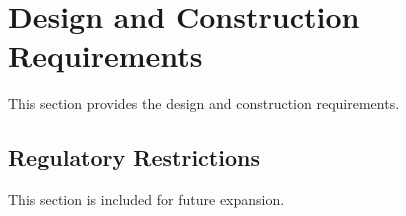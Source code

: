 \KNEADSECTIONNEWPAGE
\section{Design and Construction Requirements}
\label{lab:sec_DesignConstructionRequirements}
% 

This section provides the \ThisSys design and construction requirements.

\KNEADSUBSECTIONNEWPAGE
\subsection{Regulatory Restrictions}
\label{lab:ssec_RegulatoryRestrictions}

This section is included for future expansion.






% 




% 